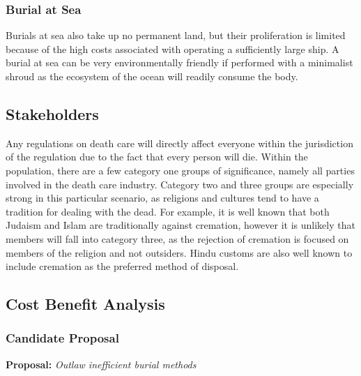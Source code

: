 \documentclass[a4paper,12pt]{article}
\begin{document}
\subsubsection{Burial at Sea}
Burials at sea also take up no permanent land, but their proliferation is limited because of the high costs associated with operating a sufficiently large ship.
A burial at sea can be very environmentally friendly if performed with a minimalist shroud as the ecosystem of the ocean will readily consume the body.

\subsection{Stakeholders}
Any regulations on death care will directly affect everyone within the jurisdiction of the regulation due to the fact that every person will die.
Within the population, there are a few category one groups of significance, namely all parties involved in the death care industry.
Category two and three groups are especially strong in this particular scenario, as religions and cultures tend to have a tradition for dealing with the dead.
For example, it is well known that both Judaism and Islam are traditionally against cremation, however it is unlikely that members will fall into category three, as the rejection of cremation is focused on members of the religion and not outsiders.
Hindu customs are also well known to include cremation as the preferred method of disposal.

\subsection{Cost Benefit Analysis}
\subsubsection{Candidate Proposal}
\textbf{Proposal: }\textit{Outlaw inefficient burial methods}
\end{document}
